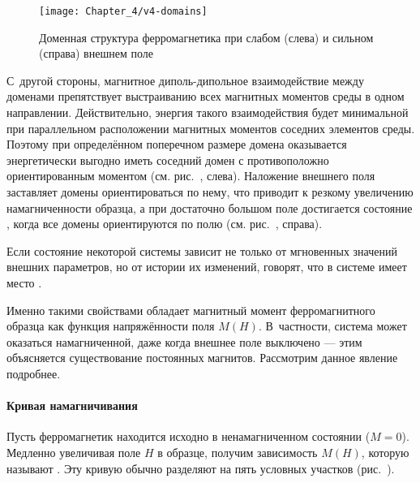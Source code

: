 \begin{wrapfigure}{o}{0.4\textwidth}
    \centering\texttt{[image: Chapter\_4/v4-domains]}
    \caption{Доменная структура ферромагнетика при слабом (слева)
    и сильном (справа) внешнем поле}
\end{wrapfigure}

С~другой стороны, магнитное диполь-дипольное взаимодействие между доменами 
препятствует
выстраиванию всех магнитных моментов среды в одном направлении.
Действительно, энергия такого взаимодействия будет минимальной
при параллельном расположении магнитных моментов соседних элементов среды.
Поэтому при определённом поперечном размере домена оказывается
энергетически выгодно иметь соседний домен с противоположно ориентированным моментом
(см. рис.~, слева).
Наложение внешнего поля заставляет домены ориентироваться
по нему, что приводит к резкому увеличению намагниченности образца, а при
достаточно большом поле достигается состояние ,
когда все домены ориентируются по полю (см. рис.~, справа).


\label{sec:histeresis}

Если состояние некоторой системы зависит не только от мгновенных значений
внешних параметров, но от истории их изменений, говорят, что
в системе имеет место .

Именно такими свойствами обладает магнитный момент ферромагнитного образца
как функция напряжённости поля $M(H)$. В~частности,
система может оказаться намагниченной, даже когда внешнее поле выключено ---
этим объясняется существование постоянных магнитов. Рассмотрим данное явление подробнее.

\paragraph{Кривая намагничивания}
Пусть ферромагнетик находится исходно в ненамагниченном состоянии
($M = 0$). Медленно увеличивая поле $H$ в образце, получим зависимость
$M(H)$, которую называют . Эту кривую обычно
разделяют на пять условных участков (рис.~).


